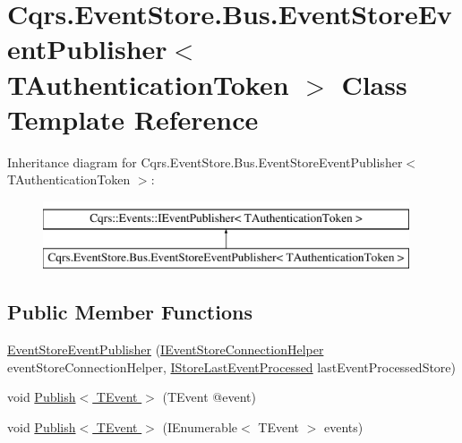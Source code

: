 \hypertarget{classCqrs_1_1EventStore_1_1Bus_1_1EventStoreEventPublisher}{}\section{Cqrs.\+Event\+Store.\+Bus.\+Event\+Store\+Event\+Publisher$<$ T\+Authentication\+Token $>$ Class Template Reference}
\label{classCqrs_1_1EventStore_1_1Bus_1_1EventStoreEventPublisher}
Inheritance diagram for Cqrs.\+Event\+Store.\+Bus.\+Event\+Store\+Event\+Publisher$<$ T\+Authentication\+Token $>$\+:\begin{figure}[H]
\begin{center}
\leavevmode
\includegraphics[height=2.000000cm]{classCqrs_1_1EventStore_1_1Bus_1_1EventStoreEventPublisher}
\end{center}
\end{figure}
\subsection*{Public Member Functions}
\begin{DoxyCompactItemize}
\item 
\hyperlink{classCqrs_1_1EventStore_1_1Bus_1_1EventStoreEventPublisher_a4ca16479fe387fae0135865ae3f889d7_a4ca16479fe387fae0135865ae3f889d7}{Event\+Store\+Event\+Publisher} (\hyperlink{interfaceCqrs_1_1EventStore_1_1IEventStoreConnectionHelper}{I\+Event\+Store\+Connection\+Helper} event\+Store\+Connection\+Helper, \hyperlink{interfaceCqrs_1_1Bus_1_1IStoreLastEventProcessed}{I\+Store\+Last\+Event\+Processed} last\+Event\+Processed\+Store)
\item 
void \hyperlink{classCqrs_1_1EventStore_1_1Bus_1_1EventStoreEventPublisher_a1ebb6f08648bdfd5c5bd29fcc12adfea_a1ebb6f08648bdfd5c5bd29fcc12adfea}{Publish$<$ T\+Event $>$} (T\+Event @event)
\item 
void \hyperlink{classCqrs_1_1EventStore_1_1Bus_1_1EventStoreEventPublisher_a85b4922ff01b088b01b39463681c6eb6_a85b4922ff01b088b01b39463681c6eb6}{Publish$<$ T\+Event $>$} (I\+Enumerable$<$ T\+Event $>$ events)
\end{DoxyCompactItemize}
